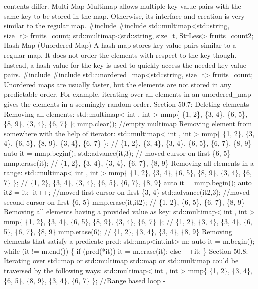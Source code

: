 contents diﬀer. Multi-Map Multimap allows multiple key-value pairs with
the same key to be stored in the map. Otherwise, its interface and
creation is very similar to the regular map. \#include \#include
std::multimap\textless std::string, size\_t\textgreater{} fruits\_count;
std::multimap\textless std::string, size\_t, StrLess\textgreater{}
fruits\_count2; Hash-Map (Unordered Map) A hash map stores key-value
pairs similar to a regular map. It does not order the elements with
respect to the key though. Instead, a hash value for the key is used to
quickly access the needed key-value pairs. \#include \#include
std::unordered\_map\textless std::string, size\_t\textgreater{}
fruits\_count; Unordered maps are usually faster, but the elements are
not stored in any predictable order. For example, iterating over all
elements in an unordered\_map gives the elements in a seemingly random
order. Section 50.7: Deleting elements Removing all elements:
std::multimap\textless{} int , int \textgreater{} mmp\{ \{1, 2\}, \{3,
4\}, \{6, 5\}, \{8, 9\}, \{3, 4\}, \{6, 7\} \}; mmp.clear(); //empty
multimap Removing element from somewhere with the help of iterator:
std::multimap\textless{} int , int \textgreater{} mmp\{ \{1, 2\}, \{3,
4\}, \{6, 5\}, \{8, 9\}, \{3, 4\}, \{6, 7\} \}; // \{1, 2\}, \{3, 4\},
\{3, 4\}, \{6, 5\}, \{6, 7\}, \{8, 9\} auto it = mmp.begin();
std::advance(it,3); // moved cursor on first \{6, 5\} mmp.erase(it); //
\{1, 2\}, \{3, 4\}, \{3, 4\}, \{6, 7\}, \{8, 9\} Removing all elements
in a range: std::multimap\textless{} int , int \textgreater{} mmp\{ \{1,
2\}, \{3, 4\}, \{6, 5\}, \{8, 9\}, \{3, 4\}, \{6, 7\} \}; // \{1, 2\},
\{3, 4\}, \{3, 4\}, \{6, 5\}, \{6, 7\}, \{8, 9\} auto it = mmp.begin();
auto it2 = it; it++; //moved first cursor on first \{3, 4\}
std::advance(it2,3); //moved second cursor on first \{6, 5\}
mmp.erase(it,it2); // \{1, 2\}, \{6, 5\}, \{6, 7\}, \{8, 9\} Removing
all elements having a provided value as key: std::multimap\textless{}
int , int \textgreater{} mmp\{ \{1, 2\}, \{3, 4\}, \{6, 5\}, \{8, 9\},
\{3, 4\}, \{6, 7\} \}; // \{1, 2\}, \{3, 4\}, \{3, 4\}, \{6, 5\}, \{6,
7\}, \{8, 9\} mmp.erase(6); // \{1, 2\}, \{3, 4\}, \{3, 4\}, \{8, 9\}
Removing elements that satisfy a predicate pred:
std::map\textless int,int\textgreater{} m; auto it = m.begin(); while
(it != m.end()) \{ if (pred(*it)) it = m.erase(it); else ++it; \}
Section 50.8: Iterating over std::map or std::multimap std::map or
std::multimap could be traversed by the following ways:
std::multimap\textless{} int , int \textgreater{} mmp\{ \{1, 2\}, \{3,
4\}, \{6, 5\}, \{8, 9\}, \{3, 4\}, \{6, 7\} \}; //Range based loop -
